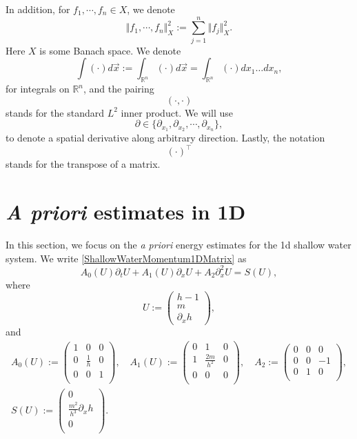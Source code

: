 \documentclass[reqno,11pt]{amsart}
\theoremstyle{plain}
\theoremstyle{definition}
\numberwithin{equation}{section}
\begin{document}
In addition, for $f_1,\cdots,f_n\in X$, we denote
\[
\Vert f_1,\cdots,f_n\Vert_{X}^2:=\sum_{j=1}^n\Vert f_j\Vert_{X}^2.
\]
Here $ X $ is some Banach space. We denote
\[
\int (\cdot)d\vec{x}:=\int_{\mathbb R^n}(\cdot) d\vec{x}=\int_{\mathbb R^n} (\cdot) dx_1\ldots dx_n,
\]
for integrals on $\mathbb R^n$, and the pairing
\[
(\cdot,\cdot)
\]
stands for the standard $L^2$ inner product. We will use
\begin{equation}
    \label{partial-z}
    \partial \in \{\partial_{x_1},\partial_{x_2},\cdots,\partial_{x_n}\},
\end{equation}
to denote a spatial derivative along arbitrary direction. Lastly, the notation
\[
(\cdot)^\top
\]
stands for the transpose of a matrix.


\section{\textit{A priori} estimates in 1D}
\label{1DEnergyEstimates}
In this section, we focus on the {\it a priori} energy estimates for the 1d shallow water system. We write \eqref{ShallowWaterMomentum1DMatrix} as
\begin{equation}
\label{ShallowWaterMomentumConsice}
A_0(U)\partial_t U+A_1(U)\partial_x U+A_2\partial_x^2 U=S(U),
\end{equation}
where
\begin{equation}
    \label{def:U}
    U := \begin{pmatrix}
        h - 1 \\ m \\ \partial_x h
    \end{pmatrix},
\end{equation}
and
\begin{equation}\label{def:As}
\begin{gathered}
    A_0(U) := \begin{pmatrix}
        1 & 0 & 0 \\
        0 & \frac{1}{h} & 0 \\
        0 & 0 & 1 \\
    \end{pmatrix}, \quad A_1(U):=\begin{pmatrix}
        0 & 1 & 0 \\
        1 & \frac{2m}{h^2} & 0 \\
        0 & 0 & 0 \\
    \end{pmatrix}, \quad A_2:=\begin{pmatrix}
        0 & 0 & 0 \\
        0 & 0 & -1 \\
        0 & 1 & 0 \\
    \end{pmatrix},  \\
    S(U):=\begin{pmatrix}
        0 \\
        \frac{m^2}{h^3}\partial_x h \\
        0 \\
    \end{pmatrix}. 
    \end{gathered}
\end{equation} 
\end{document}
